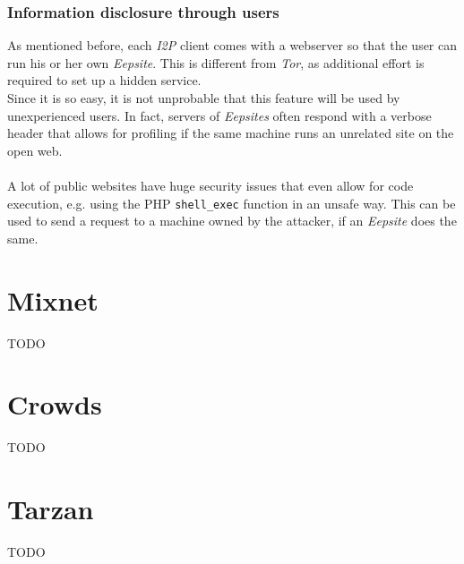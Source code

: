 \documentclass{sig-alternate}
\begin{document}
\subsubsection{Information disclosure through users}
As mentioned before, each \emph{I2P} client comes with a webserver so that the user can run his or her own \emph{Eepsite}.
This is different from \emph{Tor}, as additional effort is required to set up a hidden service.
\\
Since it is so easy, it is not unprobable that this feature will be used by unexperienced users.
In fact, servers of \emph{Eepsites} often respond with a verbose header that allows for profiling if the same machine runs an unrelated site on the open web.
\\
\\
A lot of public websites have huge security issues that even allow for code execution, e.g. using the PHP \texttt{shell\_exec} function in an unsafe way.
This can be used to send a request to a machine owned by the attacker, if an \emph{Eepsite} does the same\cite{crenshaw2011}.

\section{Mixnet}
TODO


\section{Crowds}
TODO

\section{Tarzan}
TODO




%
\end{document}
